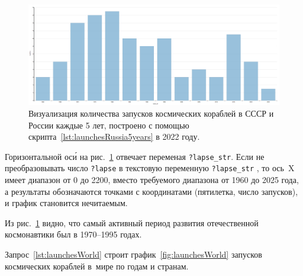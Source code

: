 \begin{figure}[h!]
  \includegraphics[width=\linewidth]{graphics/chapter/spacecraft_space_station/Visualization of the number of spacecraft launches in USSR and Russia per 5 years 2022.png}
  \caption[График запусков космических кораблей в СССР и России (по пятилеткам )]{Визуализация количества запусков космических кораблей в СССР и России каждые 5 лет, построено с помощью скрипта~\protect\ref{lst:launchesRussia5years} в 2022 году.}%
  \label{fig:launchesRussia5years}%
\end{figure}

Горизонтальной ос\'{и} на рис.~\ref{fig:launchesRussia5years} отвечает переменая \mbox{\lstinline|?lapse_str|.} 
Если не преобразовывать число \lstinline|?lapse| 
в текстовую переменную \mbox{\lstinline|?lapse_str|}%
, то ось~X имеет диапазон от 0 до 2200, 
вместо требуемого диапазона от 1960 до 2025 года, 
а результаты обозначаются точками с координатами (пятилетка, число запусков), 
и график становится нечитаемым. 

Из рис.~\ref{fig:launchesRussia5years} видно, 
что самый активный период развития отечественной космонавтики был в 1970--1995 годах.

Запрос~\ref{lst:launchesWorld} строит график~\ref{fig:launchesWorld} 
запусков космических кораблей в~мире по годам и странам.

